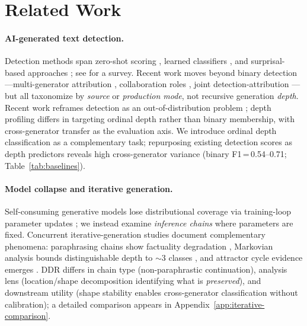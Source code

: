 \section{Related Work}
\label{sec:related}

\paragraph{AI-generated text detection.}
 Detection methods span zero-shot scoring \cite{detectgpt,fast_detectgpt,binoculars,dna_gpt}, learned classifiers \cite{ghostbuster,ld_score,reliable_detection}, and surprisal-based approaches \cite{diveye,xu_spectrum_detection}; see \citet{wu_survey_2025} for a survey.
Recent work moves beyond binary detection---multi-generator attribution \cite{semeval2024_task8}, collaboration roles \cite{beyond_binary}, joint detection-attribution \cite{two_birds}---but all taxonomize by \emph{source} or \emph{production mode}, not recursive generation \emph{depth}.
Recent work reframes detection as an out-of-distribution problem \cite{human_texts_outliers}; depth profiling differs in targeting ordinal depth rather than binary membership, with cross-generator transfer as the evaluation axis.
We introduce ordinal depth classification \cite{gutierrez_ordinal_survey,coral_ordinal} as a complementary task; repurposing existing detection scores as depth predictors reveals high cross-generator variance (binary F1\,=\,0.54--0.71; Table~\ref{tab:baselines}).

\paragraph{Model collapse and iterative generation.}
 Self-consuming generative models lose distributional coverage via training-loop parameter updates \cite{self_consuming_mad,curse_of_recursion,strong_model_collapse,dohmatob_tale_of_tails,schaeffer_collapse_position}; we instead examine \emph{inference chains} where parameters are fixed.
Concurrent iterative-generation studies document complementary phenomena: paraphrasing chains show factuality degradation \cite{broken_telephone}, Markovian analysis bounds distinguishable depth to ${\sim}$3 classes \cite{markovian_chains}, and attractor cycle evidence emerges \cite{attractor_cycles}.
DDR differs in chain type (non-paraphrastic continuation), analysis lens (location/shape decomposition identifying what is \emph{preserved}), and downstream utility (shape stability enables cross-generator classification without calibration); a detailed comparison appears in Appendix~\ref{app:iterative-comparison}.

